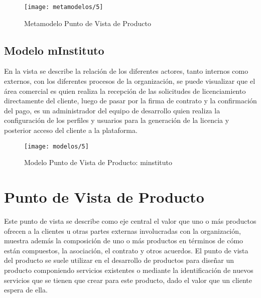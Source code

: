   \begin{figure}[H]
  	\centering
  	\texttt{[image: metamodelos/5]}
  	\captionsetup{width=.95\textwidth}
  	\caption{Metamodelo Punto de Vista de Producto}
  	\label{metamodelo5}
  \end{figure}
  
  \subsection{Modelo mInstituto}
  En la vista se describe la relación de los diferentes actores, tanto internos como externos, con los diferentes procesos de la organización, se puede visualizar que el área comercial es quien realiza la recepción de las solicitudes de licenciamiento directamente del cliente, luego de pasar por la firma de contrato y la confirmación del pago, es un administrador del equipo de desarrollo quien realiza la configuración de los perfiles y usuarios para la generación de la licencia y posterior acceso del cliente a la plataforma.
  
  \begin{figure}[H]
  	\centering
  	\texttt{[image: modelos/5]}
  	\captionsetup{width=.95\textwidth}
  	\caption{Modelo Punto de Vista de Producto: minstituto}
  	\label{modelo5}
  \end{figure}
  
\section{Punto de Vista de Producto}
Este punto de vista se describe como eje central el valor que uno o más productos ofrecen a la clientes u otras partes externas involucradas con la organización, muestra además la composición de uno o más productos en términos de cómo están compuestos, la asociación, el contrato y otros acuerdos. El punto de vista del producto se suele utilizar en el desarrollo de productos para diseñar un producto componiendo servicios existentes o mediante la identificación de nuevos servicios que se tienen que crear para este producto, dado el valor que un cliente espera de ella.

